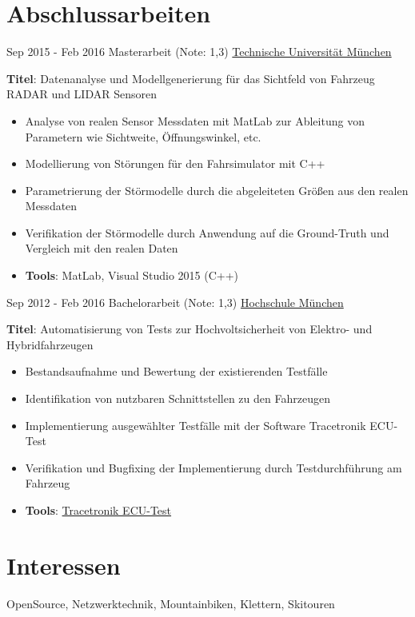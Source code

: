 \documentclass[a4paper]{twentysecondcv} %
\begin{document}
\section{Abschlussarbeiten}
\begin{twenty}
	\twentyitem
    	{Sep 2015 -}
		{Feb 2016}
        {Masterarbeit (Note: 1,3)}
        {\href{https://www.tum.de/}{Technische Universität München}}
        {}
        {
       	\textbf{Titel}: Datenanalyse und Modellgenerierung für das Sichtfeld von Fahrzeug RADAR und LIDAR Sensoren
        {\begin{itemize}
        \item Analyse von realen Sensor Messdaten mit MatLab zur Ableitung von Parametern wie Sichtweite, Öffnungswinkel, etc.
        \item Modellierung von Störungen für den Fahrsimulator mit C++
        \item Parametrierung der Störmodelle durch die abgeleiteten Größen aus den realen Messdaten
        \item Verifikation der Störmodelle durch Anwendung auf die Ground-Truth und Vergleich mit den realen Daten
        \item \textbf{Tools}: MatLab, Visual Studio 2015 (C++) \vspace{2mm}
		\end{itemize}}
        }
    \twentyitem
    {Sep 2012 -}
    {Feb 2016}
    {Bachelorarbeit (Note: 1,3)}
    {\href{https://www.hm.edu/}{Hochschule München}}
    {}
    {
    	\textbf{Titel}: Automatisierung von Tests zur Hochvoltsicherheit von Elektro- und Hybridfahrzeugen
    	{\begin{itemize}
    			\item Bestandsaufnahme und Bewertung der existierenden Testfälle
    			\item Identifikation von nutzbaren Schnittstellen zu den Fahrzeugen
    			\item Implementierung ausgewählter Testfälle mit der Software Tracetronik ECU-Test
    			\item Verifikation und Bugfixing der Implementierung durch Testdurchführung am Fahrzeug
    			\item \textbf{Tools}: \href{https://www.tracetronic.de/produkte/ecu-test/}{Tracetronik ECU-Test} \vspace{2mm}
    	\end{itemize}}
    }
\end{twenty}

\section{Interessen}
OpenSource, Netzwerktechnik, Mountainbiken, Klettern, Skitouren
\end{document}

